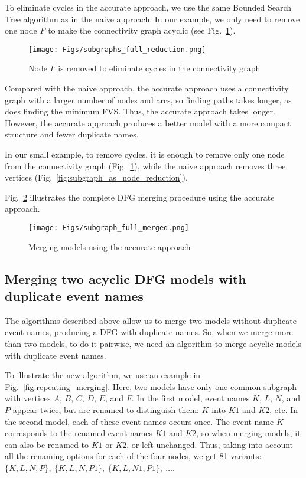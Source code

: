 \documentclass[11pt]{article}
\theoremstyle{definition}
\begin{document}
To eliminate cycles in the accurate approach, we use the same Bounded Search Tree algorithm as in the naive approach. In our example, we only need to remove one node $F$ to make the connectivity graph acyclic (see Fig.~\ref{fig:subgraph_fully_reduction}).

\begin{figure}[htb]
    \centering
    \texttt{[image: Figs/subgraphs\_full\_reduction.png]}
    \caption{Node $F$ is removed to eliminate cycles in the connectivity graph}
    \label{fig:subgraph_fully_reduction}
\end{figure}

Compared with the naive approach, the accurate approach uses a connectivity graph with a larger number of nodes and arcs, so finding paths takes longer, as does finding the minimum FVS. Thus, the accurate approach takes longer.
However, the accurate approach produces a better model with a more compact structure and fewer duplicate names.

In our small example, to remove cycles, it is enough to remove only one node from the connectivity graph (Fig.~\ref{fig:subgraph_fully_reduction}), while the naive approach removes three vertices (Fig.~\ref{fig:subgraph_as_node_reduction}).

Fig.~\ref{fig:subgraph_fully_merged} illustrates the complete DFG merging procedure using the accurate approach.

\begin{figure}[htb]
    \centering
    \texttt{[image: Figs/subgraph\_full\_merged.png]}
    \caption{Merging models using the accurate approach}
    \label{fig:subgraph_fully_merged}
\end{figure}

\subsection{Merging two acyclic DFG models with duplicate event names}\label{sec:repeat}

The algorithms described above allow us to merge two models without duplicate event names, producing a DFG with duplicate names.
So, when we merge more than two models, to do it pairwise, we need an algorithm to merge acyclic models with duplicate event names. 

To illustrate the new algorithm, we use an example in Fig.~\ref{fig:repeating_merging}.
Here, two models have only one common subgraph with vertices $A$, $B$, $C$, $D$, $E$, and $F$. 
In the first model, event names $K$, $L$, $N$, and $P$ appear twice, but are renamed to distinguish them: $K$ into $K1$ and $K2$, etc. In the second model, each of these event names occurs once. 
The event name $K$ corresponds to the renamed event names $K1$ and $K2$, so when merging models, it can also be renamed to $K1$ or $K2$, or left unchanged. Thus, taking into account all the renaming options for each of the four nodes, we get 81 variants: $\{K, L, N, P\},\ \{K, L, N, P1\},\ \{K, L, N1, P1\},\ \dots$. 
\end{document}
